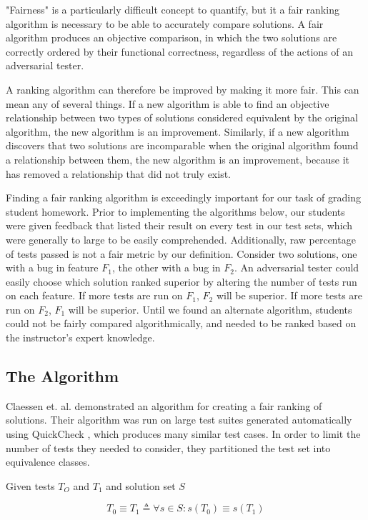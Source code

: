 \documentclass[11pt,twoside]{article}
\newcommand\defined{\triangleq}
\let\cite=\citep
\begin{document}
"Fairness" is a particularly difficult concept to quantify, but it a fair ranking algorithm is necessary to be able to accurately compare solutions. A fair algorithm produces an objective comparison, in which the two solutions are correctly ordered by their functional correctness, regardless of the actions of an adversarial tester.

A ranking algorithm can therefore be improved by making it more fair. This can mean any of several things. If a new algorithm is able to find an objective relationship between two types of solutions considered equivalent by the original algorithm, the new algorithm is an improvement. Similarly, if a new algorithm discovers that two solutions are incomparable when the original algorithm found a relationship between them, the new algorithm is an improvement, because it has removed a relationship that did not truly exist.

Finding a fair ranking algorithm is exceedingly important for our task of grading student homework. Prior to implementing the algorithms below, our students were given feedback that listed their result on every test in our test sets, which were generally to large to be easily comprehended. Additionally, raw percentage of tests passed is not a fair metric by our definition. Consider two solutions, one with a bug in feature $F_1$, the other with a bug in $F_2$. An adversarial tester could easily choose which solution ranked superior by altering the number of tests run on each feature. If more tests are run on $F_1$, $F_2$ will be superior. If more tests are run on $F_2$, $F_1$ will be superior. Until we found an alternate algorithm, students could not be fairly compared algorithmically, and needed to be ranked based on the instructor's expert knowledge.

\subsection{The Algorithm}
Claessen et. al. demonstrated an algorithm for creating a fair ranking of solutions\cite{Claessen}. Their algorithm was run on large test suites generated automatically using QuickCheck \cite{QuickCheck}, which produces many similar test cases. In order to limit the number of tests they needed to consider, they partitioned the test set into equivalence classes.

\centerline{Given tests $T_O$ and $T_1$ and solution set $S$}
$$ T_0 \equiv T_1 \defined \forall s \in S : s(T_0) \equiv s(T_1) $$
\end{document}
